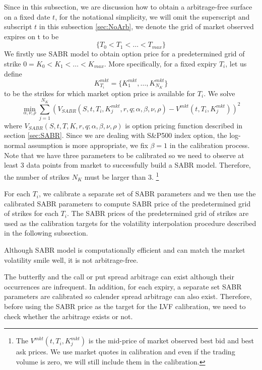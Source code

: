 \documentclass[letterpaper,12pt,titlepage,oneside,final]{book}
\numberwithin{equation}{section}
\theoremstyle{definition}
\newcommand{\Vmkt}{V^{mkt}}
\begin{document}
Since in this subsection, we are discussion how to obtain a arbitrage-free surface on a fixed date $t$, for the notational simplicity, we will omit the superscript  and subscript $t$ in this subsection \ref{sec:NoArb}, we denote the grid of market observed expires on t to be \[
\{ T_{0}<
T_1 < \dots< T_{max}
\}
\]
We firstly use SABR model to obtain option price for a predetermined grid of strike $0=K_0<K_1<\dots<K_{max}$.  More specifically, for a fixed expiry $T_i$, let us define 
\[K^{mkt}_{T_i}=
\{
	K^{mkt}_{1},\dots,K^{mkt}_{N_K}
\}
\] 
to be the strikes for which market option price is available for $T_i$.
We solve
\[
\min_{\alpha,\nu,\rho} \sum_{j=1}^{N_K} \left(V_{SABR}(S,t,T_i,K^{mkt}_j,r,q;\alpha,\beta,\nu,\rho)-\Vmkt(t,T_i,K^{mkt}_j)\right)^2
\]
where $V_{SABR}(S,t,T,K,r,q;\alpha,\beta,\nu,\rho)$ is option pricing function described in section \ref{sec:SABR}. Since we are dealing with S\&P500 index option, the log-normal assumption is more appropriate, we fix $\beta=1$ in the calibration process.  Note that we have three parameters to be calibrated so we need to observe at least 3 data points from market to successfully build a SABR model. Therefore, the number of strikes $N_K$ must be larger than 3. \footnote{The $\Vmkt(t,T_i,K^{mkt}_j)$ is the mid-price of market observed best bid and  best ask prices. We use market quotes in calibration and even if the trading volume is zero, we will still include them in the calibration.}

For each $T_i$, we calibrate a separate set of SABR parameters and we then use the calibrated SABR parameters to compute SABR price of the predetermined grid of strikes for each $T_i$.  The SABR prices of the predetermined grid of strikes are used as the calibration targets for the volatility interpolation procedure described in the following subsection.

Although SABR model is computationally efficient and can match the market volatility smile well, it is not arbitrage-free.  

The butterfly and the call or put spread arbitrage can exist although their occurrences are infrequent. In addition,  for each expiry, a separate set SABR parameters are calibrated so calender spread arbitrage can also exist. Therefore, before using the SABR price as the target for the LVF  calibration, we need to check whether the arbitrage  exists or not. 
\end{document}
